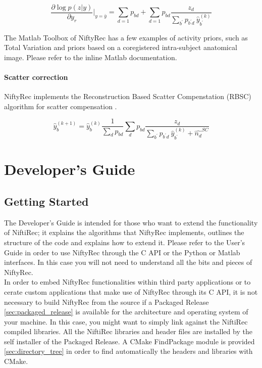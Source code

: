 \documentclass[12pt,a4paper]{report}
\begin{document}
\begin{equation}
 \frac{\partial \log p(z|y)}{\partial y_{r}}\vert_{y=\bar{y}} = \sum_{d=1}{p_{bd}} + \sum_{d=1}p_{bd}{\frac{z_d}{ \sum_{b^{\prime}}p_{b^{\prime}d}\ \hat{y}^{(k)}_{b^{\prime}} }}
\end{equation}

The Matlab Toolbox of
NiftyRec has a few examples of activity priors, such as Total Variation and
priors based on a coregistered intra-subject anatomical image. Please refer
to the inline Matlab documentation.

\subsubsection{Scatter correction}
NiftyRec implements the Reconstruction Based Scatter Compenstation (RBSC) algorithm for scatter compensation \cite{kadrmas_1998}.

\begin{equation}
 \hat{y}_b^{(k+1)} = \hat{y}_b^{(k)} \frac{1}{\sum_{d}{p_{bd}}} \sum_{d}{p_{bd}\frac{z_d}{\sum_{b^{\prime}}p_{b^{\prime}d}\ \hat{y}^{(k)}_{b^{\prime}} + \hat{n_d}^{SC} }}
\end{equation}



\chapter{Developer's Guide}

\section{Getting Started}
The Developer's Guide is intended for those who want to extend the functionality of NiftiRec; 
it explains the algorithms that NiftyRec implements, outlines the structure of the code and explains 
how to extend it. Please refer to the User's Guide in order to use NiftyRec through the C API or the Python or Matlab interfaces. 
In this case you will not need to understand all the bits and pieces of NiftyRec. \\

In order to embed NiftyRec functionalities within third party applications or to cerate custom applications 
that make use of NiftyRec through its C API, it is not necessary to build NiftyRec from the source if a Packaged 
Release \ref{sec:packaged_release} is available for the architecture and operating system of your machine. 
In this case, you might want to simply link against the NiftiRec compiled libraries. All the NiftiRec 
libraries and header files are installed by the self installer of the Packaged Release. A CMake FindPackage 
module is provided \ref{sec:directory_tree} in order to find automatically the headers and libraries with CMake.\\
\end{document}

